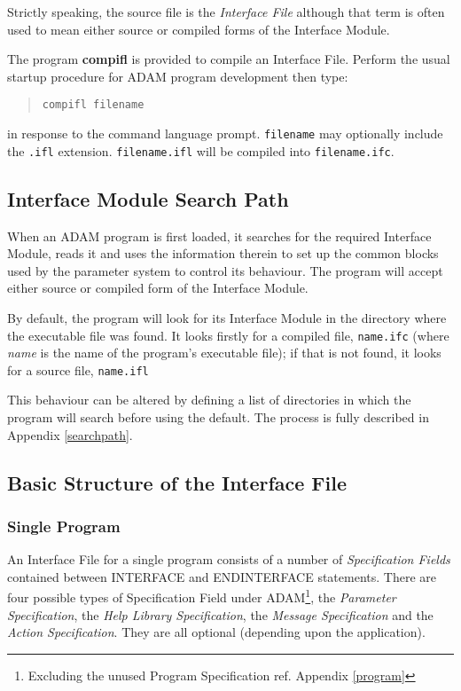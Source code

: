 \documentclass[twoside,11pt]{article}
\newcommand{\xlabel}[1]{}
\renewcommand{\_}{\texttt{\symbol{95}}}
\begin{document}
Strictly speaking, the source file is the {\em Interface File} although that 
term is often used to mean either source or compiled forms of the
Interface Module.

The program {\bf compifl} is provided to compile an Interface File. 
Perform the usual startup procedure for ADAM program development 
then type:
\begin{quote} \begin{verbatim}
compifl filename
\end{verbatim} \end{quote}
in response to the command language prompt.
\texttt{filename} may optionally include the \texttt{.ifl} extension.
\texttt{filename.ifl} will be compiled into \texttt{filename.ifc}.

\subsection{Interface Module Search Path
\xlabel{interface_module_search_path}}

When an ADAM program is first loaded, it searches for the required
Interface Module, reads it and uses the information therein to set up the
common blocks used by the parameter system to control its behaviour.
The program will accept either source or compiled form of the Interface Module.

By default, the program will look for its Interface Module in the directory
where the executable file was found. It looks firstly for a compiled file,
\texttt{name.ifc} (where {\em name} is the name of the program's executable 
file); if that is not found, it looks for a source file, \texttt{name.ifl} 

This behaviour can be altered by defining a list of directories in which
the program will search before using the default.
The process is fully described in Appendix \ref{searchpath}.

\subsection{Basic Structure of the Interface File
\xlabel{basic_structure_of_the_interface_file}}

\subsubsection{Single Program}

An Interface File for a single program consists of a number of {\em
Specification Fields} contained between INTERFACE and ENDINTERFACE
statements.
There are four possible types of
Specification Field under ADAM\footnote{Excluding the unused Program 
Specification ref. Appendix \ref{program}}, the {\em Parameter
Specification}\/, the {\em Help Library Specification}\/, the {\em Message 
Specification}\/ and the {\em Action Specification}.
They are all optional (depending upon the application).
\end{document}
